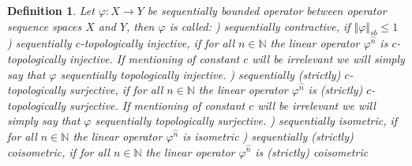 \documentclass[12pt]{article}
\newtheorem{definition}[theorem]{Definition}
\begin{document}
\begin{definition}\label{DefSBOpType}
Let $\varphi:X\to Y$ be sequentially bounded operator between operator sequence spaces $X$ and $Y$, then $\varphi$ is called:
) \textit{sequentially contractive}, if $\Vert \varphi\Vert_{sb}\leq 1$
) \textit{sequentially $c$-topologically injective}, if for all $n \in \mathbb{N}$ the linear operator $\varphi^{\wideparen{n}}$ is $c$-topologically injective. If mentioning of constant $c$ will be irrelevant we will simply say that $\varphi$ sequentially topologically injective.
) \textit{sequentially (strictly) $c$-topologically surjective}, if for all $n \in \mathbb{N}$ the linear operator $\varphi^{\wideparen{n}}$ is (strictly) $c$-topologically surjective. If mentioning of constant $c$ will be irrelevant we will simply say that $\varphi$ sequentially topologically surjective.
) \textit{sequentially isometric}, if for all $n\in\mathbb{N}$ the linear operator $\varphi^{\wideparen{n}}$ is isometric
) \textit{sequentially (strictly) coisometric}, if for all $n\in\mathbb{N}$ the linear operator $\varphi^{\wideparen{n}}$ is (strictly) coisometric
\end{definition}
\end{document}
